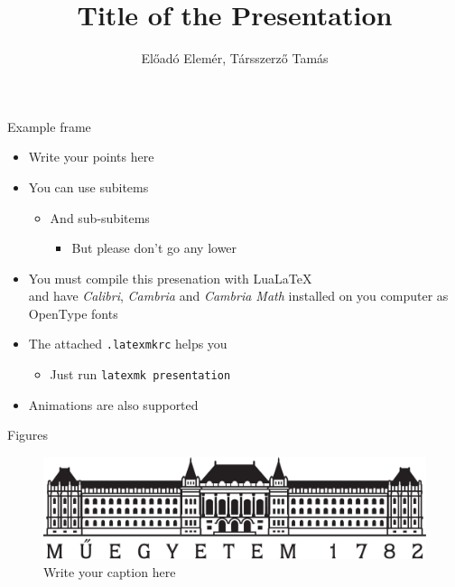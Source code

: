 \documentclass[t,aspectratio=169]{beamer}
\title{Title of the Presentation}
\author{Előadó Elemér, Társszerző Tamás}
\begin{document}
	{
		\begin{frame}
			\titlepage
		\end{frame}
	}
	\addtocounter{framenumber}{-1}
  
\begin{frame}{Example frame}
  \begin{itemize}
  \item Write your points here
  \item You can use subitems
    \begin{itemize}
    \item And sub-subitems
      \begin{itemize}
      \item But please don't go any lower
      \end{itemize}
    \end{itemize}
  \item You must compile this presenation with Lua\LaTeX\\
    and have \emph{Calibri}, \emph{Cambria} and \emph{Cambria Math}
    installed on you computer as OpenType fonts
  \item The attached \texttt{.latexmkrc} helps you
    \begin{itemize}
    \item Just run \texttt{latexmk presentation}
    \end{itemize}
  \item<2-> Animations are also supported
  \end{itemize}
\end{frame}

\begin{frame}[c]{Figures}
  \begin{figure}
    \centering
    \includegraphics[width=\textwidth]{figures/BME.pdf}
    \caption{Write your caption here}
  \end{figure}
\end{frame}
\end{document}
